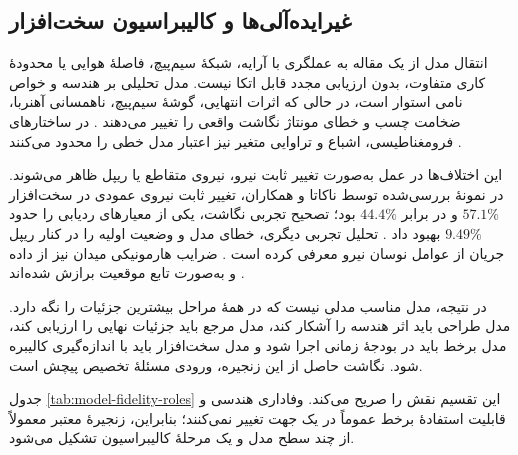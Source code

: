\subsection{غیرایده‌آلی‌ها و کالیبراسیون سخت‌افزار}
\label{subsec:model_nonidealities_calibration}

انتقال مدل از یک مقاله به عملگری با آرایه، شبکهٔ سیم‌پیچ، فاصلهٔ هوایی یا محدودهٔ کاری متفاوت، بدون ارزیابی مجدد قابل اتکا نیست. مدل تحلیلی بر هندسه و خواص نامی استوار است، در حالی که اثرات انتهایی، گوشهٔ سیم‌پیچ، ناهمسانی آهنربا، ضخامت چسب و خطای مونتاژ نگاشت واقعی را تغییر می‌دهند \cite{wangThreedimensionalElectromagneticAnalytical2025,liFiniteElementModeling2025,zhuDecouplingControlStrategy2025}. در ساختارهای فرومغناطیسی، اشباع و تراوایی متغیر نیز اعتبار مدل خطی را محدود می‌کنند \cite{hareerAnalyticalReviewLinear2026}.

این اختلاف‌ها در عمل به‌صورت تغییر ثابت نیرو، نیروی متقاطع یا ریپل ظاهر می‌شوند. در نمونهٔ بررسی‌شده توسط ناکاتا و همکاران، تغییر ثابت نیروی عمودی در سخت‌افزار \(57.1\%\) و در  برابر \(44.4\%\) بود؛ تصحیح تجربی نگاشت، یکی از معیارهای ردیابی را حدود \(9.49\%\) بهبود داد \cite{nakataCompensationFEMBased2026}. تحلیل تجربی دیگری، خطای مدل و وضعیت اولیه را در کنار ریپل جریان از عوامل نوسان نیرو معرفی کرده است \cite{liuFluctuationAnalysisElectromagnetic2024}. ضرایب هارمونیکی میدان نیز از داده و به‌صورت تابع موقعیت برازش شده‌اند \cite{wangDataDrivenMagneticField2026}.

\label{subsec:field_modeling_summary}
در نتیجه، مدل مناسب مدلی نیست که در همهٔ مراحل بیشترین جزئیات را نگه دارد. مدل طراحی باید اثر هندسه را آشکار کند، مدل مرجع باید جزئیات نهایی را ارزیابی کند، مدل برخط باید در بودجهٔ زمانی اجرا شود و مدل سخت‌افزار باید با اندازه‌گیری کالیبره شود. نگاشت حاصل از این زنجیره، ورودی مسئلهٔ تخصیص پیچش است.

جدول \ref{tab:model-fidelity-roles} این تقسیم نقش را صریح می‌کند. وفاداری هندسی و قابلیت استفادهٔ برخط عموماً در یک جهت تغییر نمی‌کنند؛ بنابراین، زنجیرهٔ معتبر معمولاً از چند سطح مدل و یک مرحلهٔ کالیبراسیون تشکیل می‌شود.

